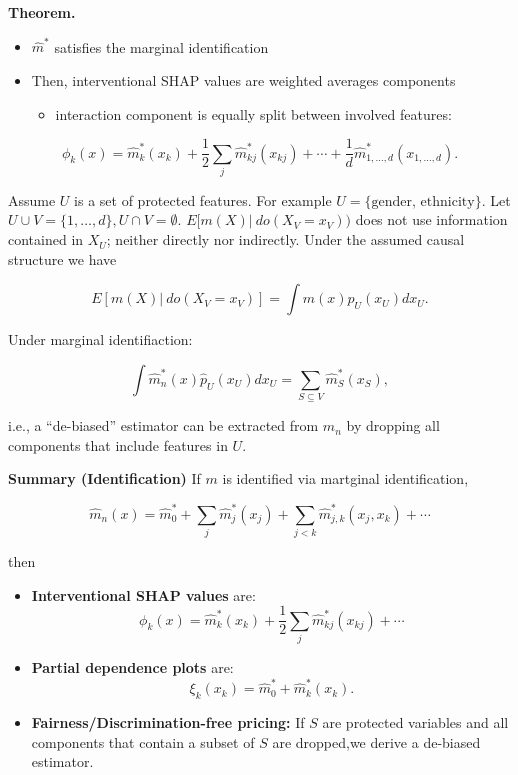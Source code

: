 \documentclass[a4paper,12pt,openany]{book}
\providecommand{\tightlist}{%
 \setlength{\itemsep}{0pt}\setlength{\parskip}{0pt}}
\begin{document}
\textbf{Theorem.}

\begin{itemize}
\tightlist
\item
  \(\hat m^{\ast}\) satisfies the marginal identification
\item
  Then, interventional SHAP values are weighted averages components

  \begin{itemize}
  \tightlist
  \item
    interaction component is equally split between involved features:
  \end{itemize}
\end{itemize}

\[
\phi_k(x)= \hat m^{\ast}_k(x_k)+ \frac 1 2 \sum_j  \hat m^{\ast}_{kj}(x_{kj}) + \cdots + \frac 1 d \hat m^{\ast}_{1,\dots,d}(x_{1,\dots,d}).
\]

Assume \(U\) is a set of protected features. For example \(U=\{\text{gender, ethnicity}\}\). Let \(U \cup V=\{1,\dots, d\}, U\cap V=\emptyset\). \(E[m(X) |\  do(X_V=x_V))\) does not use information contained in \(X_U\); neither directly nor indirectly. Under the assumed causal structure we have

\[
E[m(X) |\ do(X_V=x_V)]= \int m(x) p_U(x_U) dx_U.
\]

Under marginal identifiaction:

\[
\int \hat m_n^\ast(x) \hat p_U(x_U) dx_U= \sum_{S \subseteq V} \hat {m}^\ast_S(x_S),
\]

i.e., a ``de-biased'' estimator can be extracted from \(\hat m_n\) by dropping all components that include features in \(U\).

\textbf{Summary (Identification)} If \(m\) is identified via martginal identification,

\[
\hat m_n(x)=\hat m_0^\ast + \sum_j \hat m_j ^\ast (x_j) + \sum_{j<k} \hat m_{j,k} ^\ast (x_j,x_k)+ \cdots
\]

then

\begin{itemize}
\tightlist
\item
  \textbf{Interventional SHAP values} are:
  \[
    \phi_k(x)= \hat m^{\ast}_k(x_k)+ \frac 1 2 \sum_j  \hat m^{\ast}_{kj}(x_{kj}) + \cdots 
    \]
\item
  \textbf{Partial dependence plots} are:
  \[
    \xi_k(x_k)= \hat m_0^{\ast} + \hat m_k^\ast(x_k).
    \]
\item
  \textbf{Fairness/Discrimination-free pricing:} If \(S\) are protected variables and all components that contain a subset of \(S\) are dropped,we derive a de-biased estimator.
\end{itemize}
\end{document}
